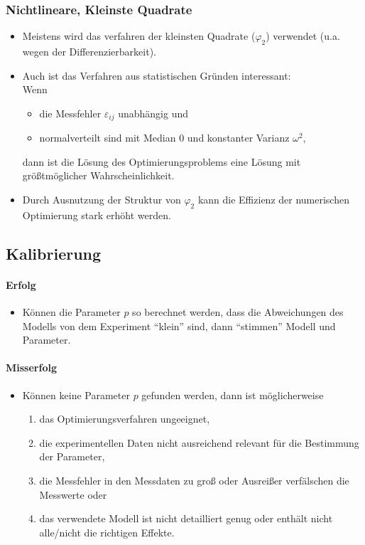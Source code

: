 			\subsubsection{Nichtlineare, Kleinste Quadrate} %
				\begin{itemize}
					\item Meistens wird das verfahren der kleinsten Quadrate (\( \varphi _ 2 \)) verwendet (u.a. wegen der Differenzierbarkeit).
					\item Auch ist das Verfahren aus statistischen Gründen interessant: \\ Wenn
						\begin{itemize}
							\item die Messfehler \( \varepsilon _ {ij} \) unabhängig und
							\item normalverteilt sind mit Median \(0\) und konstanter Varianz \( \omega^2 \),
						\end{itemize}
						dann ist die Lösung des Optimierungsproblems eine Lösung mit größtmöglicher Wahrscheinlichkeit.
					\item Durch Ausnutzung der Struktur von \( \varphi _ 2 \) kann die Effizienz der numerischen Optimierung stark erhöht werden.
				\end{itemize}

		\subsection{Kalibrierung} %
			\paragraph{Erfolg}
				\begin{itemize}
					\item Können die Parameter \(p\) so berechnet werden, dass die Abweichungen des Modells von dem Experiment \enquote{klein} sind, dann \enquote{stimmen} Modell und Parameter.
				\end{itemize}

			\paragraph{Misserfolg}
				\begin{itemize}
					\item Können keine Parameter \(p\) gefunden werden, dann ist möglicherweise
						\begin{enumerate}
							\item das Optimierungsverfahren ungeeignet,
							\item die experimentellen Daten nicht ausreichend relevant für die Bestimmung der Parameter,
							\item die Messfehler in den Messdaten zu groß oder Ausreißer verfälschen die Messwerte oder
							\item das verwendete Modell ist nicht detailliert genug oder enthält nicht alle/nicht die richtigen Effekte.
						\end{enumerate}
				\end{itemize}

